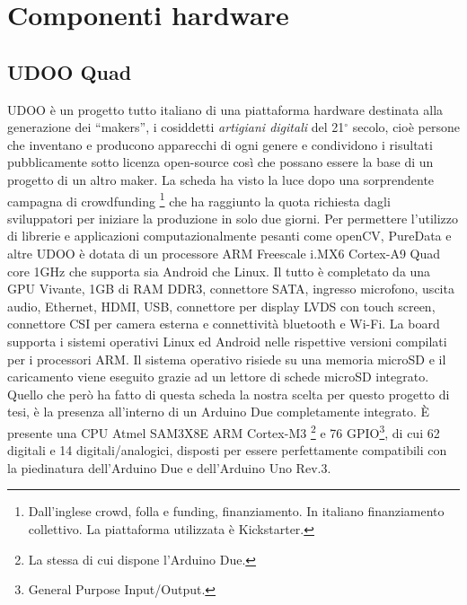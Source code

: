 \chapter{Componenti hardware}
\fancyfoot[C]{\thepage } 
\section{UDOO Quad}
UDOO è un progetto tutto italiano di una piattaforma hardware destinata alla 
generazione dei ``makers'', i cosiddetti \emph{artigiani digitali} del 21$^\circ$ secolo,
cioè persone che inventano e producono apparecchi di ogni genere e condividono i risultati 
pubblicamente sotto licenza open-source così che possano essere la base di un 
progetto di un altro maker. La 
scheda ha visto la luce dopo una sorprendente campagna di crowdfunding
\footnote{Dall'inglese crowd, folla e funding, finanziamento. In italiano 
finanziamento collettivo. La piattaforma utilizzata è Kickstarter.} che ha raggiunto la quota richiesta dagli sviluppatori 
per iniziare la produzione in solo due giorni. 
Per permettere l'utilizzo di librerie e applicazioni computazionalmente pesanti 
come openCV, PureData e altre UDOO è dotata di un processore ARM Freescale i.MX6 
Cortex-A9 Quad core 1GHz che supporta sia Android che Linux. Il tutto è 
completato da una GPU Vivante, 1GB di RAM DDR3, connettore SATA, ingresso microfono, 
uscita audio, Ethernet, HDMI, USB, connettore per display LVDS 
con touch screen, connettore CSI per camera esterna e connettività bluetooth e 
Wi-Fi. La board supporta i sistemi operativi Linux ed Android nelle rispettive 
versioni compilati per i processori ARM. Il sistema operativo risiede su una memoria 
microSD e il caricamento viene eseguito grazie ad un lettore di schede microSD integrato. 
Quello che però ha fatto di questa scheda la nostra scelta per questo 
progetto di tesi, è la presenza all'interno di un Arduino Due completamente integrato.
È presente una CPU Atmel SAM3X8E ARM Cortex-M3 \footnote{La stessa di cui 
dispone l'Arduino Due.} e 76 GPIO\footnote{General Purpose Input/Output.}, di 
cui 62 digitali e 14 digitali/analogici, disposti per essere perfettamente 
compatibili con la piedinatura dell'Arduino Due e dell'Arduino Uno Rev.3.

